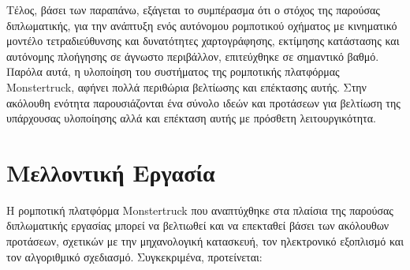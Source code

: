 \bigskip
Τέλος, βάσει των παραπάνω, εξάγεται το συμπέρασμα ότι ο στόχος της παρούσας διπλωματικής, για την ανάπτυξη ενός αυτόνομου ρομποτικού οχήματος με κινηματικό μοντέλο τετραδιεύθυνσης και δυνατότητες χαρτογράφησης, εκτίμησης κατάστασης και αυτόνομης πλοήγησης σε άγνωστο περιβάλλον, επιτεύχθηκε σε σημαντικό βαθμό. Παρόλα αυτά, η υλοποίηση του συστήματος της ρομποτικής πλατφόρμας Monstertruck, αφήνει πολλά περιθώρια βελτίωσης και επέκτασης αυτής. Στην ακόλουθη ενότητα παρουσιάζονται ένα σύνολο ιδεών και προτάσεων για βελτίωση της υπάρχουσας υλοποίησης αλλά και επέκταση αυτής με πρόσθετη λειτουργικότητα.

\section{Μελλοντική Εργασία}
Η ρομποτική πλατφόρμα Monstertruck που αναπτύχθηκε στα πλαίσια της παρούσας διπλωματικής εργασίας μπορεί να βελτιωθεί και να επεκταθεί βάσει των ακόλουθων προτάσεων, σχετικών με την μηχανολογική κατασκευή, τον ηλεκτρονικό εξοπλισμό και τον αλγοριθμικό σχεδιασμό. Συγκεκριμένα, προτείνεται:

